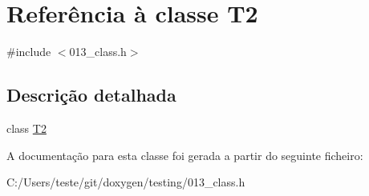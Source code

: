 \hypertarget{class_t2}{\section{Referência à classe T2}
\label{class_t2}
}


{\ttfamily \#include $<$013\-\_\-class.\-h$>$}



\subsection{Descrição detalhada}
class \hyperlink{class_t2}{T2} 

A documentação para esta classe foi gerada a partir do seguinte ficheiro\-:\begin{DoxyCompactItemize}
\item 
C\-:/\-Users/teste/git/doxygen/testing/013\-\_\-class.\-h\end{DoxyCompactItemize}
